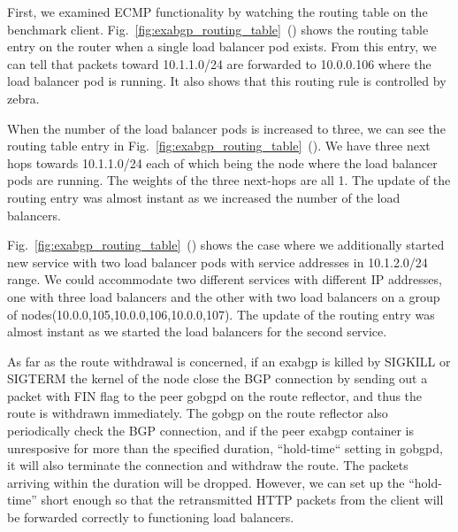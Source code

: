 First, we examined ECMP functionality by watching the routing table on the benchmark client.
Fig.~\ref{fig:exabgp_routing_table}~() shows the routing table entry on the router when a single load balancer pod exists.
From this entry, we can tell that packets toward 10.1.1.0/24 are forwarded to 10.0.0.106 where the load balancer pod is running.
It also shows that this routing rule is controlled by zebra.

When the number of the load balancer pods is increased to three, we can see the routing table entry in Fig.~\ref{fig:exabgp_routing_table}~().
We have three next hops towards 10.1.1.0/24 each of which being the node where the load balancer pods are running.
The weights of the three next-hops are all 1.
The update of the routing entry was almost instant as we increased the number of the load balancers.

Fig.~\ref{fig:exabgp_routing_table}~() shows the case where we additionally started new service with two load balancer pods with service addresses in 10.1.2.0/24 range.
We could accommodate two different services with different IP addresses, one with three load balancers and the other with two load balancers on a group of nodes(10.0.0,105,10.0.0,106,10.0.0,107).
The update of the routing entry was almost instant as we started the load balancers for the second service.

As far as the route withdrawal is concerned, if an exabgp is killed by SIGKILL or SIGTERM the kernel of the node close the BGP connection by sending out a packet with FIN flag to the peer gobgpd on the route reflector, and thus the route is withdrawn immediately.
The gobgp on the route reflector also periodically check the BGP connection, and if the peer exabgp container is unresposive for more than the specified duration, “hold-time“ setting in gobgpd, it will also terminate the connection and withdraw the route.
The packets arriving within the duration will be dropped.
However, we can set up the “hold-time” short enough so that the retransmitted HTTP packets from the client will be forwarded correctly to functioning load balancers.


